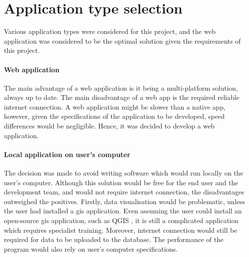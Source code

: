 \section{Application type selection}

Various application types were considered for this project, and the web application was considered to be the optimal solution given the requirements of this project.


\paragraph{Web application}

The main advantage of a web application is it being a multi-platform solution, always up to date. The main disadvantage of a web app is the required reliable internet connection. A web application might be slower than a native app, however, given the specifications of the application to be developed, speed differences would be negligible. Hence, it was decided to develop a web application.


\paragraph{Local application on user's computer}

The decision was made to avoid writing software which would run locally on the user's computer. Although this solution would be free for the end user and the development team, and would not require internet connection, the disadvantages outweighed the positives. Firstly, data visualisation would be problematic, unless the user had installed a \gls{gis} application. Even assuming the user could install an open-source \gls{gis} application, such as QGIS \cite{qgis}, it is still a complicated application which requires specialist training. Moreover, internet connection would still be required for data to be uploaded to the database. The performance of the program would also rely on user's computer specifications.

